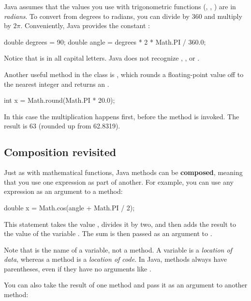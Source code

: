 Java assumes that the values you use with trigonometric functions (, , ) are in {\em radians}.
To convert from degrees to radians, you can divide by 360 and multiply by $2 \pi$.
Conveniently, Java provides the constant :

\begin{code}
    double degrees = 90;
    double angle = degrees * 2 * Math.PI / 360.0;
\end{code}

Notice that  is in all capital letters.
Java does not recognize , , or .

Another useful method in the  class is , which rounds a floating-point value off to the nearest integer and returns an .

\begin{code}
    int x = Math.round(Math.PI * 20.0);
\end{code}

In this case the multiplication happens first, before the method is invoked.
The result is 63 (rounded up from 62.8319).

\subsection{Composition revisited}


Just as with mathematical functions, Java methods can be {\bf composed}, meaning that you use one expression as part of another.
For example, you can use any expression as an argument to a method:

\begin{code}
    double x = Math.cos(angle + Math.PI / 2);
\end{code}

This statement takes the value , divides it by two, and then adds the result to the value of the variable .
The sum is then passed as an argument to .

Note that  is the name of a variable, not a method.
A variable is a {\em location of data}, whereas a method is a {\em location of code}.
In Java, methods always have parentheses, even if they have no arguments like .

You can also take the result of one method and pass it as an argument to another method:

